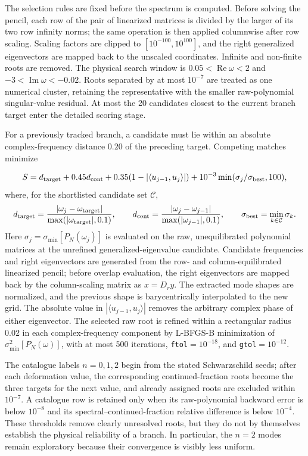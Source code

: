 \documentclass[12pt,a4paper]{article}
\begin{document}
The selection rules are fixed before the spectrum is computed. Before solving
the pencil, each row of the pair of
linearized matrices is divided by the larger of its two row infinity norms;
the same operation is then applied columnwise after row scaling.  Scaling
factors are clipped to \([10^{-100},10^{100}]\), and the right generalized
eigenvectors are mapped back to the unscaled coordinates.  Infinite and
non-finite roots are removed.  The physical search window is
\(0.05<\operatorname{Re}\omega<2\) and
\(-3<\operatorname{Im}\omega<-0.02\).  Roots separated by at most
\(10^{-7}\) are treated as one numerical cluster, retaining the representative
with the smaller raw-polynomial singular-value residual.  At most the 20
candidates closest to the current branch target enter the detailed scoring stage.

For a previously tracked branch, a candidate must lie within an absolute
complex-frequency distance \(0.20\) of the preceding target.  Competing
matches minimize

\begin{equation*}
S=d_{\rm target}+0.45d_{\rm cont}+0.35(1-|\langle u_{j-1},u_j\rangle|)
+10^{-3}\min(\sigma_j/\sigma_{\rm best},100),
\end{equation*}
where, for the shortlisted candidate set \(\mathcal C\),
\begin{equation*}
d_{\rm target}=\frac{|\omega_j-\omega_{\rm target}|}
{\max(|\omega_{\rm target}|,0.1)},\qquad
d_{\rm cont}=\frac{|\omega_j-\omega_{j-1}|}
{\max(|\omega_{j-1}|,0.1)},\qquad
\sigma_{\rm best}=\min_{k\in\mathcal C}\sigma_k.
\end{equation*}
Here \(\sigma_j=\sigma_{\min}[P_N(\omega_j)]\) is evaluated on the raw,
unequilibrated polynomial matrices at the unrefined generalized-eigenvalue
candidate.  Candidate frequencies and right eigenvectors are generated from
the row- and column-equilibrated linearized pencil; before overlap evaluation,
the right eigenvectors are mapped back by the column-scaling matrix as
\(x=D_r y\).  The extracted mode shapes are normalized, and the previous shape
is barycentrically interpolated to the new grid.  The absolute value in
\(|\langle u_{j-1},u_j\rangle|\) removes the arbitrary complex phase of either
eigenvector.
The selected raw root is refined within a rectangular radius \(0.02\) in each
complex-frequency component by L-BFGS-B minimization of
\(\sigma_{\min}^2[P_N(\omega)]\), with at most 500 iterations,
\texttt{ftol}\(=10^{-18}\), and \texttt{gtol}\(=10^{-12}\).

The catalogue labels \(n=0,1,2\) begin from the stated Schwarzschild seeds;
after each deformation value, the corresponding continued-fraction roots
become the three targets for the next value, and already assigned roots are
excluded within \(10^{-7}\). A catalogue row is retained only when its
raw-polynomial backward error is below \(10^{-8}\) and its
spectral--continued-fraction relative difference is below \(10^{-4}\). These
thresholds remove clearly unresolved roots, but they do not by themselves
establish the physical reliability of a branch. In particular, the \(n=2\)
modes remain exploratory because their convergence is visibly less uniform.
\end{document}
